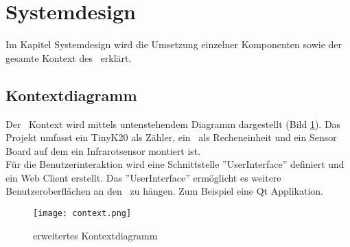 \section{Systemdesign}
    Im Kapitel Systemdesign wird die Umsetzung einzelner Komponenten sowie der gesamte Kontext des \documenttitle\ erklärt.
        \subsection{Kontextdiagramm}
        Der \documenttitle\ Kontext wird mittels untenstehendem Diagramm dargestellt (Bild \ref{fig:kontext}). Das Projekt umfasst ein TinyK20 als Zähler, ein \rpi\ als Recheneinheit und ein Sensor Board auf dem ein Infrarotsensor montiert ist.\\
        Für die Benutzerinteraktion wird eine Schnittstelle ''UserInterface'' definiert und ein Web Client erstellt. Das ''UserInterface'' ermöglicht es weitere Benutzeroberflächen an den \documenttitle\ zu hängen. Zum Beispiel eine Qt Applikation.
        \begin{figure}[H]
            \centering
            \texttt{[image: context.png]}
            \caption{erweitertes Kontextdiagramm}
            \label{fig:kontext}
        \end{figure}


        \clearpage
        
        
        \clearpage
		
        \clearpage
		
        \clearpage
        
        \clearpage
        
        \clearpage
        
        \clearpage
        
        \clearpage
		
